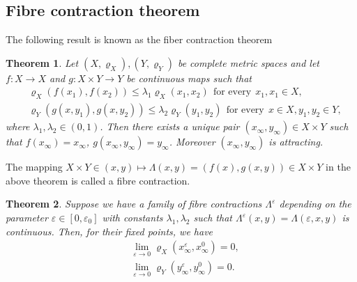 \documentclass[11pt, leqno]{amsart}
\newtheorem{thm}{Theorem}[section]
\theoremstyle{definition}
\begin{document}
\subsection{Fibre contraction theorem}
The following result is known as the fiber contraction theorem \cite[Theorem 1.2]{Hirsch_Pugh}
\begin{thm}\label{thm:fibre}
	Let $(X,\varrho_X), (Y, \varrho_Y)$ be complete metric spaces and let $f:X\to X$ and $g:X\times Y \to  Y$ be continuous maps such that
	\begin{align*}
		&\varrho_X(f(x_1),f(x_2)) \leq \lambda_1  \varrho_X(x_1,x_2)\ \ \textrm{for every}\ \ x_1,x_1\in X,\\
		&\varrho_Y(g(x,y_1),g(x,y_2)) \leq \lambda_2  \varrho_Y(y_1,y_2)\ \ \textrm{for every}\ \ x\in X,y_1,y_2\in Y,
	\end{align*}
	where $\lambda_1,\lambda_2\in (0,1)$. Then there exists a unique pair $(x_\infty,y_\infty)\in X\times Y$ such that $f(x_\infty)=x_\infty$, $g(x_\infty,y_\infty) = y_\infty$. Moreover $(x_\infty,y_\infty)$ is attracting.
\end{thm}
The mapping $X\times Y \in (x,y) \mapsto \Lambda(x,y) = (f(x),g(x,y)) \in X\times Y$ in the above theorem is called a fibre contraction.
\begin{thm}\label{thm:param}
	Suppose we have a family of fibre contractions $\Lambda^\varepsilon$ depending on the parameter $\varepsilon \in [0,\varepsilon_0]$ with constants $\lambda_1, \lambda_2$ such that $\Lambda^\varepsilon(x,y) = \Lambda(\varepsilon,x,y)$ is continuous. Then, for their fixed points, we have
	\begin{align*}
	& \lim_{\varepsilon\to 0}\varrho_X(x_\infty^\varepsilon,x_\infty^0) = 0,\\
	& \lim_{\varepsilon\to 0}\varrho_Y(y_\infty^\varepsilon,y_\infty^0) = 0.
	\end{align*}
	\end{thm}  
\end{document}
